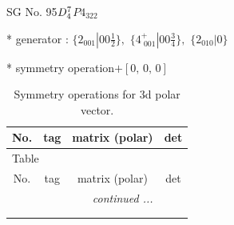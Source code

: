 \documentclass[fleqn,8pt]{jsarticle}
\begin{document}
\setcounter{MaxMatrixCols}{32}

\renewcommand{\tablename}{Table~}
\renewcommand{\figurename}{Figure~}
\begin{center}
\LARGE
SG No. 95\quad$D_{\rm 4}^{7}$\quad$P4_322$\quad[ tetragonal ]
\end{center}

* generator : $\{2{}_{001}|0 0 \frac{1}{2}\},\,\,\{4^{+}_{\,\,001}|0 0 \frac{3}{4}\},\,\,\{2{}_{010}|0\}$

* symmetry operation\quad$+\left[ 0,\, 0,\, 0 \right]$
\renewcommand{\arraystretch}{1.3}
\begin{longtable}{cccc}
\caption{Symmetry operations for 3d polar vector.}
 \\
 \hline \hline
No. & tag & matrix (polar) & det \\ \hline \endfirsthead

\multicolumn{3}{l}{\tablename\ \thetable{}} \\
 \hline \hline
No. & tag & matrix (polar) & det \\ \hline \endhead

 \hline \hline
\multicolumn{3}{r}{\footnotesize\it continued ...} \\ \endfoot

 \hline \hline
\multicolumn{3}{r}{} \\ \endlastfoot


\end{longtable}
\end{document}
